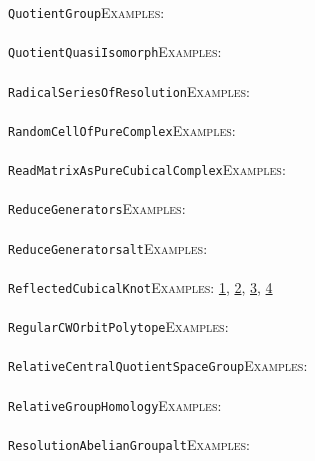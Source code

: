 \documentclass[a4paper,11pt]{report}
\begin{document}
{{ \texttt{QuotientGroup}{\nobreakspace}{\nobreakspace}{\nobreakspace}{\nobreakspace}\textsc{Examples:} \\
 \\
 \texttt{QuotientQuasiIsomorph}{\nobreakspace}{\nobreakspace}{\nobreakspace}{\nobreakspace}\textsc{Examples:} \\
 \\
 \texttt{RadicalSeriesOfResolution}{\nobreakspace}{\nobreakspace}{\nobreakspace}{\nobreakspace}\textsc{Examples:} \\
 \\
 \texttt{RandomCellOfPureComplex}{\nobreakspace}{\nobreakspace}{\nobreakspace}{\nobreakspace}\textsc{Examples:} \\
 \\
 \texttt{ReadMatrixAsPureCubicalComplex}{\nobreakspace}{\nobreakspace}{\nobreakspace}{\nobreakspace}\textsc{Examples:} \\
 \\
 \texttt{ReduceGenerators}{\nobreakspace}{\nobreakspace}{\nobreakspace}{\nobreakspace}\textsc{Examples:} \\
 \\
 \texttt{ReduceGenerators{\textunderscore}alt}{\nobreakspace}{\nobreakspace}{\nobreakspace}{\nobreakspace}\textsc{Examples:} \\
 \\
 \texttt{ReflectedCubicalKnot}{\nobreakspace}{\nobreakspace}{\nobreakspace}{\nobreakspace}\textsc{Examples:} \href{tutorial/chap2.html} {1}{\nobreakspace}, \href{tutorial/chap3.html} {2}{\nobreakspace}, \href{tutorial/chap5.html} {3}{\nobreakspace}, \href{../www/SideLinks/About/aboutCoverinSpaces.html} {4}{\nobreakspace} \\
 \\
 \texttt{RegularCWOrbitPolytope}{\nobreakspace}{\nobreakspace}{\nobreakspace}{\nobreakspace}\textsc{Examples:} \\
 \\
 \texttt{RelativeCentralQuotientSpaceGroup}{\nobreakspace}{\nobreakspace}{\nobreakspace}{\nobreakspace}\textsc{Examples:} \\
 \\
 \texttt{RelativeGroupHomology}{\nobreakspace}{\nobreakspace}{\nobreakspace}{\nobreakspace}\textsc{Examples:} \\
 \\
 \texttt{ResolutionAbelianGroup{\textunderscore}alt}{\nobreakspace}{\nobreakspace}{\nobreakspace}{\nobreakspace}\textsc{Examples:} \\
 \\
}}
\end{document}
